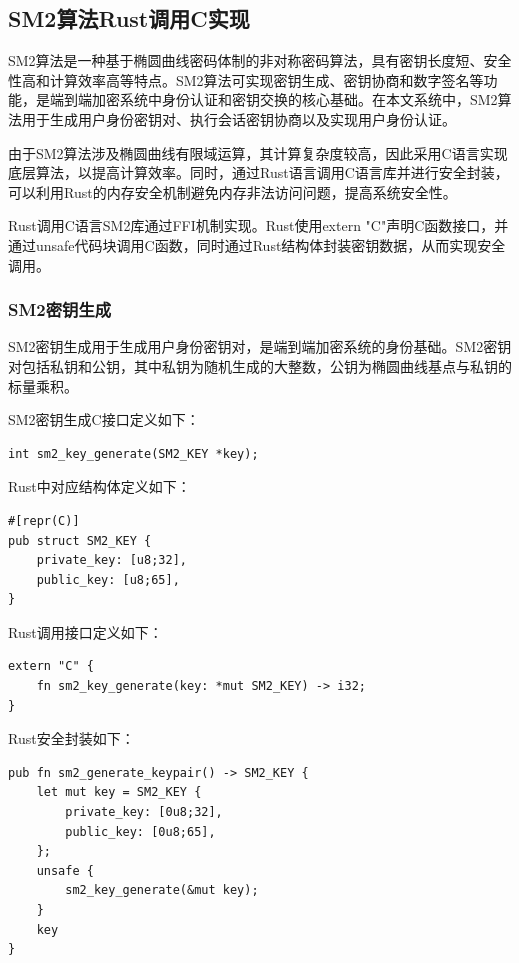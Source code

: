 \subsection{SM2算法Rust调用C实现}
SM2算法是一种基于椭圆曲线密码体制的非对称密码算法，具有密钥长度短、安全性高和计算效率高等特点。SM2算法可实现密钥生成、密钥协商和数字签名等功能，是端到端加密系统中身份认证和密钥交换的核心基础。在本文系统中，SM2算法用于生成用户身份密钥对、执行会话密钥协商以及实现用户身份认证。

由于SM2算法涉及椭圆曲线有限域运算，其计算复杂度较高，因此采用C语言实现底层算法，以提高计算效率。同时，通过Rust语言调用C语言库并进行安全封装，可以利用Rust的内存安全机制避免内存非法访问问题，提高系统安全性。

Rust调用C语言SM2库通过FFI机制实现。Rust使用extern "C"声明C函数接口，并通过unsafe代码块调用C函数，同时通过Rust结构体封装密钥数据，从而实现安全调用。

\subsubsection{SM2密钥生成}

SM2密钥生成用于生成用户身份密钥对，是端到端加密系统的身份基础。SM2密钥对包括私钥和公钥，其中私钥为随机生成的大整数，公钥为椭圆曲线基点与私钥的标量乘积。

SM2密钥生成C接口定义如下：

\begin{lstlisting}
int sm2_key_generate(SM2_KEY *key);
\end{lstlisting}

Rust中对应结构体定义如下：

\begin{lstlisting}
#[repr(C)]
pub struct SM2_KEY {
    private_key: [u8;32],
    public_key: [u8;65],
}
\end{lstlisting}

Rust调用接口定义如下：

\begin{lstlisting}
extern "C" {
    fn sm2_key_generate(key: *mut SM2_KEY) -> i32;
}
\end{lstlisting}

Rust安全封装如下：

\begin{lstlisting}
pub fn sm2_generate_keypair() -> SM2_KEY {
    let mut key = SM2_KEY {
        private_key: [0u8;32],
        public_key: [0u8;65],
    };
    unsafe {
        sm2_key_generate(&mut key);
    }
    key
}
\end{lstlisting}

